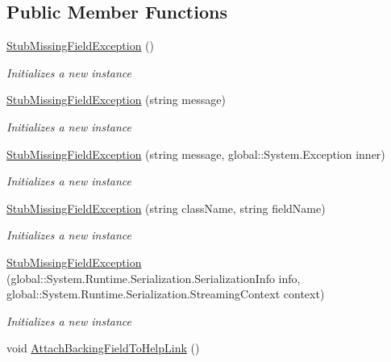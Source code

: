 \subsection*{Public Member Functions}
\begin{DoxyCompactItemize}
\item 
\hyperlink{class_system_1_1_fakes_1_1_stub_missing_field_exception_a1f251460e5bb06fdbeb9f600d25a9007}{Stub\-Missing\-Field\-Exception} ()
\begin{DoxyCompactList}\small\item\em Initializes a new instance\end{DoxyCompactList}\item 
\hyperlink{class_system_1_1_fakes_1_1_stub_missing_field_exception_ad645ba7376fcf60fe0411924dc422d72}{Stub\-Missing\-Field\-Exception} (string message)
\begin{DoxyCompactList}\small\item\em Initializes a new instance\end{DoxyCompactList}\item 
\hyperlink{class_system_1_1_fakes_1_1_stub_missing_field_exception_ab6b0b193eac978754fa771fa4db0e00c}{Stub\-Missing\-Field\-Exception} (string message, global\-::\-System.\-Exception inner)
\begin{DoxyCompactList}\small\item\em Initializes a new instance\end{DoxyCompactList}\item 
\hyperlink{class_system_1_1_fakes_1_1_stub_missing_field_exception_a217a8f02c8dd56a2d058086a38a5d2a0}{Stub\-Missing\-Field\-Exception} (string class\-Name, string field\-Name)
\begin{DoxyCompactList}\small\item\em Initializes a new instance\end{DoxyCompactList}\item 
\hyperlink{class_system_1_1_fakes_1_1_stub_missing_field_exception_aa7f9c915ac0b94aa8728f950606f46db}{Stub\-Missing\-Field\-Exception} (global\-::\-System.\-Runtime.\-Serialization.\-Serialization\-Info info, global\-::\-System.\-Runtime.\-Serialization.\-Streaming\-Context context)
\begin{DoxyCompactList}\small\item\em Initializes a new instance\end{DoxyCompactList}\item 
void \hyperlink{class_system_1_1_fakes_1_1_stub_missing_field_exception_a73f75eedea4f9234258ab6bbdb1ae873}{Attach\-Backing\-Field\-To\-Help\-Link} ()

\end{DoxyCompactItemize}
